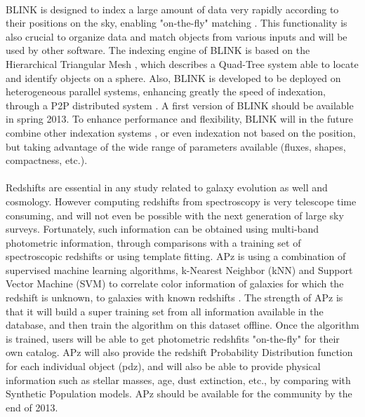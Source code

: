 \\
BLINK is designed to index a large amount of data very rapidly according to their positions on the sky, enabling "on-the-fly" matching \citep{blink}. This functionality is also crucial to organize data and match objects from various inputs and will be used by other software. The indexing engine of BLINK is based on the Hierarchical Triangular Mesh \citep[HTM -][]{htm}, which describes a Quad-Tree system able to locate and identify objects on a sphere. Also, BLINK is developed to be deployed on heterogeneous parallel systems, enhancing greatly the speed of indexation, through a P2P distributed system \citep[c.f.][]{tang10}. A first version of BLINK should be available in spring 2013. To enhance performance and flexibility, BLINK will in the future combine other indexation systems \citep[HEALPix -][]{healpix}, or even indexation not based on the position, but taking advantage of the wide range of parameters available (fluxes, shapes, compactness, etc.).\\

\\
Redshifts are essential in any study related to galaxy evolution as well and cosmology. However computing redshifts from spectroscopy is very telescope time consuming, and will not even be possible with the next generation of large sky surveys. Fortunately, such information can be obtained using multi-band photometric information, through comparisons with a training set of spectroscopic redshifts or using template fitting. APz is using a combination of supervised machine learning algorithms, k-Nearest Neighbor (kNN) and Support Vector Machine (SVM) to correlate color information of galaxies for which the redshift is unknown, to galaxies with known redshifts \citep[refer to e.g.,][]{bb10}. The strength of APz is that it will build a super training set from all information available in the database, and then train the algorithm on this dataset offline. Once the algorithm is trained, users will be able to get photometric redshfits "on-the-fly" for their own catalog. APz will also provide the redshift Probability Distribution function for each individual object (pdz), and will also be able to provide physical information such as stellar masses, age, dust extinction, etc., by comparing with Synthetic Population models. APz should be available for the community by the end of 2013.\\

